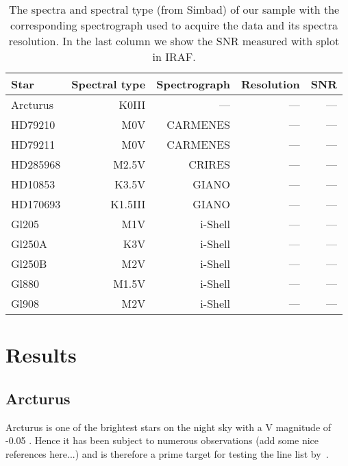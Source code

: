 \documentclass{aa}
\begin{document}
\begin{table*}[htb!]
    \caption{The spectra and spectral type (from Simbad) of our sample with
             the corresponding spectrograph used to acquire the data and its
             spectra resolution. In the last column we show the SNR measured
             with splot in IRAF.}
\label{tab:data}
    \centering
    \begin{tabular}{lrrrr}
      \hline\hline
        Star      & Spectral type & Spectrograph  & Resolution   &  SNR  \\
      \hline
        Arcturus  &      K0III    &  ---          &    ---       &  ---  \\
        HD79210   &      M0V      & CARMENES      &    ---       &  ---  \\
        HD79211   &      M0V      & CARMENES      &    ---       &  ---  \\
        HD285968  &      M2.5V    & CRIRES        &    ---       &  ---  \\
        HD10853   &      K3.5V    & GIANO         &    ---       &  ---  \\
        HD170693  &      K1.5III  & GIANO         &    ---       &  ---  \\
        Gl205     &      M1V      & i-Shell       &    ---       &  ---  \\
        Gl250A    &      K3V      & i-Shell       &    ---       &  ---  \\
        Gl250B    &      M2V      & i-Shell       &    ---       &  ---  \\
        Gl880     &      M1.5V    & i-Shell       &    ---       &  ---  \\
        Gl908     &      M2V      & i-Shell       &    ---       &  ---  \\
    \end{tabular}
\end{table*}



\section{Results}
\label{sec:results}


\subsection{Arcturus}
\label{sec:derived_parameters_of_the_sun}
Arcturus is one of the brightest stars on the night sky with a V magnitude of
-0.05 \citep{Ducati2002}. Hence it has been subject to numerous observations
(add some nice references here...) and is therefore a prime target for testing
the line list by~\cite{Andreasen2016}.
\end{document}
